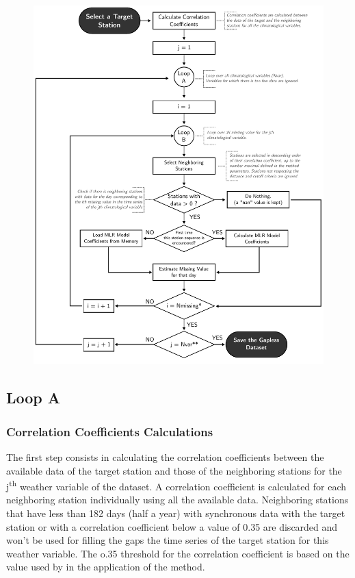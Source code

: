 \documentclass[TechnicalNoteMeteo.tex]{subfiles}
\begin{document}
\begin{figure}[!p]
    \centering
    \includegraphics[width=\textwidth]{img/Flowchart-filling_missing_weather.pdf} 
    \caption{}
    \label{fig:fillworker_flowchart}
\end{figure}

\subsection{Loop A}

\subsubsection{Correlation Coefficients Calculations}

The first step consists in calculating the correlation coefficients between the available data of the target station and those of the neighboring stations for the j\textsuperscript{th} weather variable of the dataset. A correlation coefficient is calculated for each neighboring station individually using all the available data. Neighboring stations that have less than 182 days (half a year) with synchronous data with the target station or with a correlation coefficient below a value of 0.35 are discarded and won't be used for filling the gaps the time series of the target station for this weather variable. The o.35 threshold for the correlation coefficient is based on the value used by \cite{eischeid_creating_2000} in the application of the method. 
\end{document}
